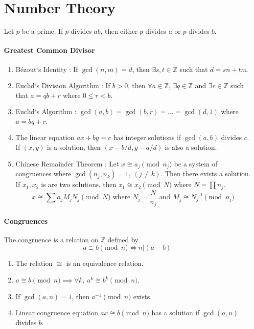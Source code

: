 \section{Number Theory}
\begin{lemma}[Euclid]
	Let $p$ be a prime. If $p$ divides $ab$, then either $p$ divides $a$ or $p$ divides $b$.
\end{lemma}

\paragraph{Greatest Common Divisor}
\begin{enumerate}
	\item B\'ezout`s Identity : If $\gcd(n,m)= d$, then $\exists s,t \in \mathbb{Z}$ such that $d = sn+tm$.
	\item Euclid`s Division Algorithm : If $b > 0$, then $\forall a \in \mathbb{Z}$, $\exists q \in \mathbb{Z}$ and $\exists r \in \mathbb{Z}$ such that $a = qb+r$ where $0 \le r < b$.
	\item Euclid`s Algorithm : $\gcd(a,b) = \gcd(b,r) = \dots = \gcd(d,1)$ where $a = bq+r$.
	\item The linear equation $ax+by=c$ has integer solutions if $\gcd(a,b)$ divides $c$.\\ If $(x,y)$ is a solution, then $(x-b/d,y-a/d)$ is also a solution.
	\item Chinese Remainder Theorem : Let $x \cong a_j \pmod{n_j}$ be a system of congruences where $\gcd(n_j,n_k) = 1,\ (j \ne k)$. Then there exists a solution.\\ If $x_1,x_2$ is are two solutions, then $x_1 \cong x_2 \pmod{N}$ where $N = \prod n_j$.
		$$x \cong \sum a_j M_j N_j \pmod{N} \text{ where } N_j = \frac{N}{n_j} \text{ and } M_j \cong N_j^{-1} \pmod{n_j}$$
\end{enumerate}

\paragraph{Congruences}
\begin{definition}
	The congruence is a relation on $\mathbb{Z}$ defined by
	$$a \cong b \pmod{n} \iff n | (a-b)$$
\end{definition}
\begin{enumerate}
	\item The relation $\cong$ is an equivalence relation.
	\item $a \cong b \pmod{n} \implies \forall k,\ a^k \cong b^k \pmod{n}$.
	\item If $\gcd(a,n) = 1$, then $a^{-1} \pmod{n}$ exists.
	\item Linear congruence equation $ax \cong b \pmod{n}$ has a solution if $\gcd(a,n)$ divides $b$.
\end{enumerate}

